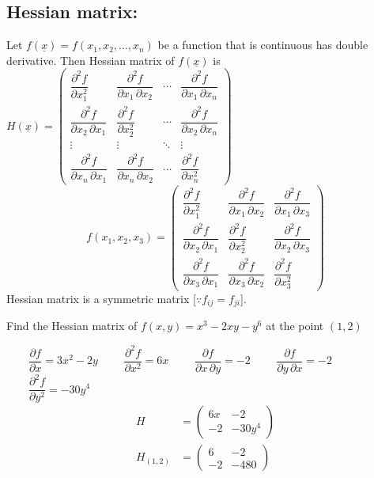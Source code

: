 \documentclass[../main-sheet.tex]{subfiles}
\begin{document}
\subsection{Hessian matrix:} Let \(f(\underline{x})=f(x_1,x_2,\dots,x_n)\) be a function that is continuous has double derivative. Then Hessian matrix of \(f(\underline{x})\) is \(H(\underline{x})=\begin{pmatrix}
        \dfrac{\partial^2 f}{\partial x_1^2} & \dfrac{\partial^2 f}{\partial x_1\,\partial x_2} & \cdots & \dfrac{\partial^2 f}{\partial x_1\,\partial x_n} \\[2.2ex]
        \dfrac{\partial^2 f}{\partial x_2\,\partial x_1} & \dfrac{\partial^2 f}{\partial x_2^2} & \cdots & \dfrac{\partial^2 f}{\partial x_2\,\partial x_n} \\[2.2ex]
        \vdots & \vdots & \ddots & \vdots \\[2.2ex]
        \dfrac{\partial^2 f}{\partial x_n\,\partial x_1} & \dfrac{\partial^2 f}{\partial x_n\,\partial x_2} & \cdots & \dfrac{\partial^2 f}{\partial x_n^2}
\end{pmatrix}\)\\
    \[f(x_1,x_2,x_3)=\begin{pmatrix}
        \dfrac{\partial^2 f}{\partial x_1^2} & \dfrac{\partial^2 f}{\partial x_1\,\partial x_2} & \dfrac{\partial^2 f}{\partial x_1\,\partial x_3} \\[2.2ex]
        \dfrac{\partial^2 f}{\partial x_2\,\partial x_1} & \dfrac{\partial^2 f}{\partial x_2^2} & \dfrac{\partial^2 f}{\partial x_2\,\partial x_3} \\[2.2ex]
        \dfrac{\partial^2 f}{\partial x_3\,\partial x_1} & \dfrac{\partial^2 f}{\partial x_3\,\partial x_2} & \dfrac{\partial^2 f}{\partial x_3^2}
      \end{pmatrix}
      \]
      Hessian matrix is a symmetric matrix [\(\because f_{ij}=f_{ji}\)].
      \begin{prob}
          Find the Hessian matrix of \(f(x,y)=x^3-2xy-y^6\) at the point \((1,2)\)
      \end{prob}
      \begin{soln}\hfill

          \(\qquad\dfrac{\partial f}{\partial x}=3x^2-2y\)
          \(\qquad\dfrac{\partial^2 f}{\partial x^2}=6x\)
          \(\qquad\dfrac{\partial f}{\partial x \,\partial y}=-2\)
          \(\qquad\dfrac{\partial f}{\partial y \,\partial x}=-2\)
          \(\qquad\dfrac{\partial^2 f}{\partial y^2}=-30y^4\)
          \begin{align*}
            H&=\begin{pmatrix}
                6x&-2\\
                -2&-30y^4
            \end{pmatrix}\\
            H_{(1,2)}&=\begin{pmatrix}
                6&-2\\
                -2&-480
            \end{pmatrix}
        \end{align*}
      \end{soln}
\end{document}

